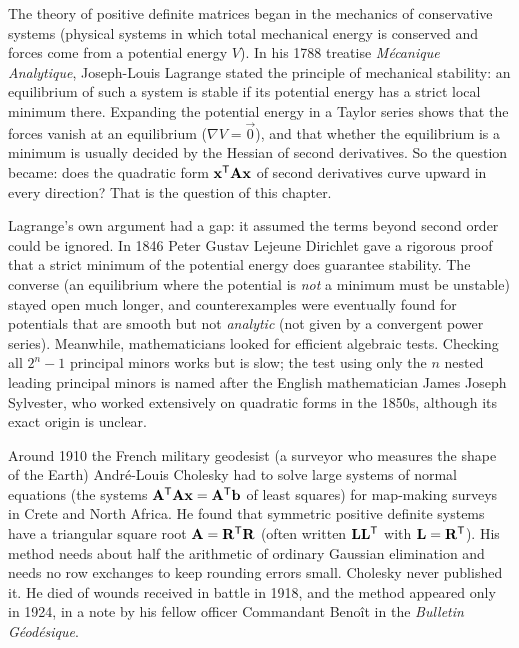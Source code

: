\begin{historybox}
The theory of positive definite matrices began in the mechanics of conservative systems (physical
systems in which total mechanical energy is conserved and forces come from a potential energy $V$).
In his 1788 treatise \emph{M\'ecanique Analytique}, Joseph-Louis Lagrange stated the principle of
mechanical stability: an equilibrium of such a system is stable if its potential energy has a strict
local minimum there. Expanding the potential energy in a Taylor series shows that the forces vanish
at an equilibrium ($\nabla V = \vec{0}$), and that whether the equilibrium is a minimum is usually
decided by the Hessian of second derivatives. So the question became: does the quadratic form
$\mathbf{x}^{\mathsf{T}}\mathbf{A}\mathbf{x}$ of second derivatives curve upward in every direction? That is the
question of this chapter.

Lagrange's own argument had a gap: it assumed the terms beyond second order could be ignored. In
1846 Peter Gustav Lejeune Dirichlet gave a rigorous proof that a strict minimum of the potential
energy does guarantee stability. The converse (an equilibrium where the potential is \emph{not} a
minimum must be unstable) stayed open much longer, and counterexamples were eventually found for
potentials that are smooth but not \emph{analytic} (not given by a convergent power series).
Meanwhile, mathematicians looked for efficient algebraic tests. Checking all $2^n-1$ principal
minors works but is slow; the test using only the $n$ nested leading principal minors is named after
the English mathematician James Joseph Sylvester, who worked extensively on quadratic forms in the
1850s, although its exact origin is unclear.

Around 1910 the French military geodesist (a surveyor who measures the shape of the Earth)
Andr\'e-Louis Cholesky had to solve large systems of normal equations (the systems
$\mathbf{A}^{\mathsf{T}}\mathbf{A}\mathbf{x} = \mathbf{A}^{\mathsf{T}}\mathbf{b}$ of least squares) for map-making surveys in Crete and
North Africa. He found that symmetric positive definite systems have a triangular square root
$\mathbf{A} = \mathbf{R}^{\mathsf{T}}\mathbf{R}$ (often written $\mathbf{L}\mathbf{L}^{\mathsf{T}}$ with $\mathbf{L}=\mathbf{R}^{\mathsf{T}}$). His method
needs about half the arithmetic of ordinary Gaussian elimination and needs no row exchanges to keep
rounding errors small. Cholesky never published it. He died of wounds received in battle in 1918,
and the method appeared only in 1924, in a note by his fellow officer Commandant Beno\^it in the
\emph{Bulletin G\'eod\'esique}.


\end{historybox}

